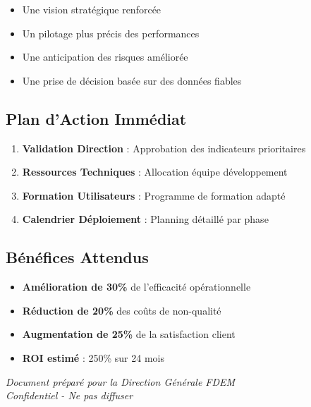 \documentclass[12pt,a4paper]{article}
\begin{document}
\begin{itemize}
    \item Une vision stratégique renforcée
    \item Un pilotage plus précis des performances
    \item Une anticipation des risques améliorée
    \item Une prise de décision basée sur des données fiables
\end{itemize}

\subsection{Plan d'Action Immédiat}

\begin{enumerate}
    \item \textbf{Validation Direction} : Approbation des indicateurs prioritaires
    \item \textbf{Ressources Techniques} : Allocation équipe développement
    \item \textbf{Formation Utilisateurs} : Programme de formation adapté
    \item \textbf{Calendrier Déploiement} : Planning détaillé par phase
\end{enumerate}

\subsection{Bénéfices Attendus}

\begin{itemize}
    \item \textbf{Amélioration de 30\%} de l'efficacité opérationnelle
    \item \textbf{Réduction de 20\%} des coûts de non-qualité
    \item \textbf{Augmentation de 25\%} de la satisfaction client
    \item \textbf{ROI estimé} : 250\% sur 24 mois
\end{itemize}

\vfill

\begin{center}
\textit{Document préparé pour la Direction Générale FDEM}\\
\textit{Confidentiel - Ne pas diffuser}
\end{center}
\end{document}
